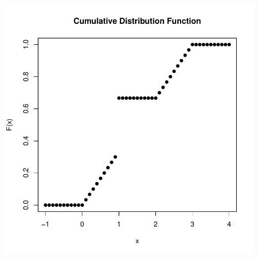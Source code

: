 \documentclass[letterpaper,12pt]{article}
\begin{document}
\begin{center}
    \includegraphics{piecewise.pdf}
\end{center}
\end{document}
